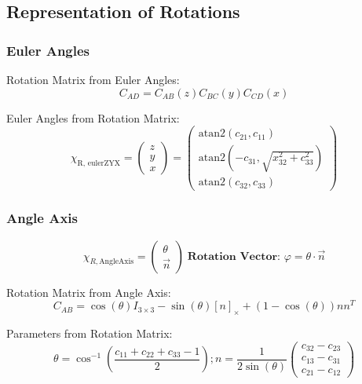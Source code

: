 \documentclass[fontsize=6pt,DIV=calc,a4paper,ngerman]{scrartcl}
\begin{document}
\begin{multicols*}{4}
	\subsection{Representation of Rotations}
	\subsubsection{Euler Angles}

	Rotation Matrix from Euler Angles:
	$$ C_{AD} = C_{AB}(z) C_{BC}(y) C_{CD}(x) $$

	Euler Angles from Rotation Matrix:
	$$\chi_{\text{R, eulerZYX}}
		= \begin{pmatrix} z \\ y \\ x \end{pmatrix}
		= \begin{pmatrix}
			\text{atan2}(c_{21}, c_{11})                      \\
			\text{atan2}(-c_{31}, \sqrt{x_{32}^2 + c_{33}^2}) \\
			\text{atan2}(c_{32}, c_{33})
		\end{pmatrix}
	$$


	\subsubsection{Angle Axis}
	$$\chi_{R,\text{AngleAxis}}=\begin{pmatrix}\theta \\ \overrightarrow{n}\end{pmatrix} \; \textbf{Rotation Vector: } \varphi = \theta\cdot\overrightarrow{n}$$

	Rotation Matrix from Angle Axis:
	$$ C_{AB} = \cos(\theta) I_{3\times3} - \sin(\theta) [n]_\times  + (1- \cos(\theta)) nn^T $$

	Parameters from Rotation Matrix:
	$$ \theta = \cos^{-1} \left( \frac{c_{11} + c_{22} + c_{33} - 1}{2} \right);
		n = \frac{1}{2\sin(\theta)}
		\begin{pmatrix}
			c_{32} - c_{23} \\
			c_{13} - c_{31} \\
			c_{21} - c_{12}
		\end{pmatrix} $$


\end{multicols*}
\end{document}
